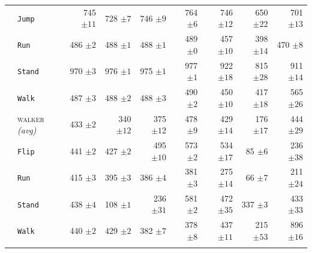 \documentclass{article}
\theoremstyle{plain}
\theoremstyle{definition}
\theoremstyle{remark}
\newcommand{\domainavg}[1]{\textsc{#1} \textit{(avg)}}
\begin{document}
\begin{table}
\begin{tabular}{l l r r r r r r r}
& \hspace{.5em}\texttt{Jump} & 745 ${\scriptstyle \pm 11}$ & 728 ${\scriptstyle \pm 7}$ & 746 ${\scriptstyle \pm 9}$ & 764 ${\scriptstyle \pm 6}$ & 746 ${\scriptstyle \pm 12}$ & 650 ${\scriptstyle \pm 22}$ & 701 ${\scriptstyle \pm 13}$ \\
& \hspace{.5em}\texttt{Run} & 486 ${\scriptstyle \pm 2}$ & 488 ${\scriptstyle \pm 1}$ & 488 ${\scriptstyle \pm 1}$ & 489 ${\scriptstyle \pm 0}$ & 457 ${\scriptstyle \pm 10}$ & 398 ${\scriptstyle \pm 14}$ & 470 ${\scriptstyle \pm 8}$ \\
& \hspace{.5em}\texttt{Stand} & 970 ${\scriptstyle \pm 3}$ & 976 ${\scriptstyle \pm 1}$ & 975 ${\scriptstyle \pm 1}$ & 977 ${\scriptstyle \pm 1}$ & 922 ${\scriptstyle \pm 18}$ & 815 ${\scriptstyle \pm 28}$ & 911 ${\scriptstyle \pm 14}$ \\
& \hspace{.5em}\texttt{Walk} & 487 ${\scriptstyle \pm 3}$ & 488 ${\scriptstyle \pm 2}$ & 488 ${\scriptstyle \pm 3}$ & 490 ${\scriptstyle \pm 2}$ & 450 ${\scriptstyle \pm 10}$ & 417 ${\scriptstyle \pm 18}$ & 565 ${\scriptstyle \pm 26}$ \\
\addlinespace
 \rowcolor{gray!15}  \cellcolor{white} & \domainavg{walker} & 433 ${\scriptstyle \pm 2}$ & 340 ${\scriptstyle \pm 12}$ & 375 ${\scriptstyle \pm 12}$ & 478 ${\scriptstyle \pm 9}$ & 429 ${\scriptstyle \pm 14}$ & 176 ${\scriptstyle \pm 17}$ & 444 ${\scriptstyle \pm 29}$ \\
& \hspace{.5em}\texttt{Flip} & 441 ${\scriptstyle \pm 2}$ & 427 ${\scriptstyle \pm 2}$ & 495 ${\scriptstyle \pm 10}$ & 573 ${\scriptstyle \pm 2}$ & 534 ${\scriptstyle \pm 17}$ & 85 ${\scriptstyle \pm 6}$ & 236 ${\scriptstyle \pm 38}$ \\
& \hspace{.5em}\texttt{Run} & 415 ${\scriptstyle \pm 3}$ & 395 ${\scriptstyle \pm 3}$ & 386 ${\scriptstyle \pm 4}$ & 381 ${\scriptstyle \pm 3}$ & 275 ${\scriptstyle \pm 14}$ & 66 ${\scriptstyle \pm 7}$ & 211 ${\scriptstyle \pm 24}$ \\
& \hspace{.5em}\texttt{Stand} & 438 ${\scriptstyle \pm 4}$ & 108 ${\scriptstyle \pm 1}$ & 236 ${\scriptstyle \pm 31}$ & 581 ${\scriptstyle \pm 2}$ & 472 ${\scriptstyle \pm 35}$ & 337 ${\scriptstyle \pm 3}$ & 433 ${\scriptstyle \pm 33}$ \\
& \hspace{.5em}\texttt{Walk} & 440 ${\scriptstyle \pm 2}$ & 429 ${\scriptstyle \pm 2}$ & 382 ${\scriptstyle \pm 7}$ & 378 ${\scriptstyle \pm 8}$ & 437 ${\scriptstyle \pm 11}$ & 215 ${\scriptstyle \pm 53}$ & 896 ${\scriptstyle \pm 16}$ \\
\addlinespace

\bottomrule

\end{tabular}
\end{table}
\end{document}
